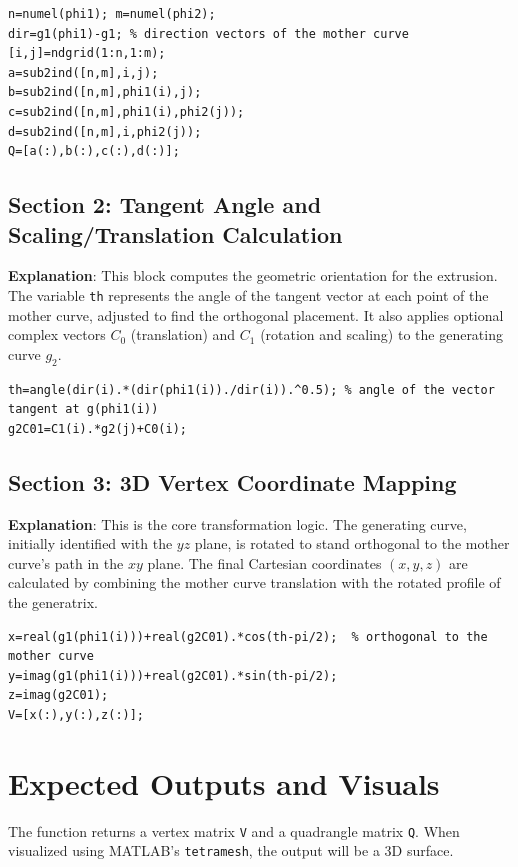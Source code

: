\begin{lstlisting}
n=numel(phi1); m=numel(phi2);
dir=g1(phi1)-g1; % direction vectors of the mother curve
[i,j]=ndgrid(1:n,1:m);
a=sub2ind([n,m],i,j);
b=sub2ind([n,m],phi1(i),j);
c=sub2ind([n,m],phi1(i),phi2(j));
d=sub2ind([n,m],i,phi2(j));
Q=[a(:),b(:),c(:),d(:)];
\end{lstlisting}

\subsection{Section 2: Tangent Angle and Scaling/Translation Calculation}
\textbf{Explanation}: This block computes the geometric orientation for the extrusion. The variable \texttt{th} represents the angle of the tangent vector at each point of the mother curve, adjusted to find the orthogonal placement. It also applies optional complex vectors $C_0$ (translation) and $C_1$ (rotation and scaling) to the generating curve $g_2$.

\begin{lstlisting}
th=angle(dir(i).*(dir(phi1(i))./dir(i)).^0.5); % angle of the vector tangent at g(phi1(i))
g2C01=C1(i).*g2(j)+C0(i);
\end{lstlisting}

\subsection{Section 3: 3D Vertex Coordinate Mapping}
\textbf{Explanation}: This is the core transformation logic. The generating curve, initially identified with the $yz$ plane, is rotated to stand orthogonal to the mother curve's path in the $xy$ plane. The final Cartesian coordinates $(x, y, z)$ are calculated by combining the mother curve translation with the rotated profile of the generatrix.

\begin{lstlisting}
x=real(g1(phi1(i)))+real(g2C01).*cos(th-pi/2);  % orthogonal to the mother curve
y=imag(g1(phi1(i)))+real(g2C01).*sin(th-pi/2);
z=imag(g2C01);
V=[x(:),y(:),z(:)];
\end{lstlisting}



\section{Expected Outputs and Visuals}

The function returns a vertex matrix \texttt{V} and a quadrangle matrix \texttt{Q}. When visualized using MATLAB's \texttt{tetramesh}, the output will be a 3D surface.

